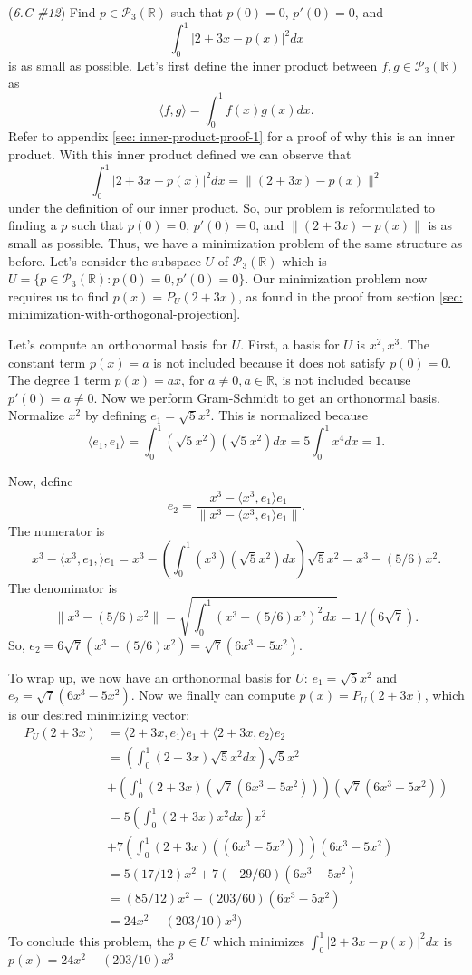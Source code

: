 \documentclass{article}
\newcommand{\R}{\mathbb{R}}
\newcommand{\la}{\langle}
\newcommand{\ra}{\rangle}
\theoremstyle{definition}
\begin{document}
\begin{problem}{(\textit{6.C \#12}) Find $p \in \mathcal{P}_3(\R)$ such that $p(0) = 0$, $p'(0) = 0$, and $$\int_0^1 |2 + 3x - p(x)|^2dx$$ is as small as possible.}
    Let's first define the inner product between $f, g \in \mathcal{P}_3(\R)$ as $$\la f, g \ra = \int_0^1 f(x)g(x) dx.$$ Refer to appendix \ref{sec: inner-product-proof-1} for a proof of why this is an inner product. With this inner product defined we can observe that $$\int_0^1 |2 + 3x - p(x)|^2dx = \|(2 + 3x) - p(x)\|^2$$ under the definition of our inner product. So, our problem is reformulated to finding a $p$ such that $p(0) = 0$, $p'(0) = 0$, and $\|(2 + 3x) - p(x)\|$ is as small as possible. Thus, we have a minimization problem of the same structure as before. Let's consider the subspace $U$ of $\mathcal{P}_3(\R)$ which is $U = \{p \in \mathcal{P}_3(\R) : p(0) = 0, p'(0) = 0\}$. Our minimization problem now requires us to find $p(x) = P_U(2 + 3x)$, as found in the proof from section \ref{sec: minimization-with-orthogonal-projection}.

    Let's compute an orthonormal basis for $U$. First, a basis for $U$ is $x^2, x^3$. The constant term $p(x) = a$ is not included because it does not satisfy $p(0) = 0$. The degree 1 term $p(x) = ax$, for $a \neq 0, a \in \R$, is not included because $p'(0) = a \neq 0$. Now we perform Gram-Schmidt to get an orthonormal basis. Normalize $x^2$ by defining $e_1 = \sqrt{5}x^2$. This is normalized because $$\la e_1, e_1 \ra = \int_0^1(\sqrt{5}x^2)(\sqrt{5}x^2)dx = 5\int_0^1x^4dx = 1.$$

    Now, define $$e_2 = \frac{x^3 - \la x^3, e_1 \ra e_1}{\|x^3 - \la x^3, e_1 \ra e_1\|}.$$ The numerator is $$x^3 - \la x^3, e_1, \ra e_1 = x^3 - \left(\int_0^1 (x^3)(\sqrt{5}x^2)dx\right) \sqrt{5}x^2 = x^3 - (5/6)x^2.$$ The denominator is $$\|x^3 - (5/6)x^2\| = \sqrt{\int_0^1 (x^3 - (5/6)x^2)^2dx} = 1/(6\sqrt{7}).$$ So, $e_2 = 6\sqrt{7}(x^3 - (5/6)x^2) = \sqrt{7}(6x^3 - 5x^2)$.

    To wrap up, we now have an orthonormal basis for $U$: $e_1 = \sqrt{5}x^2$ and $e_2 = \sqrt{7}(6x^3-5x^2)$. Now we finally can compute $p(x) = P_U(2 + 3x)$, which is our desired minimizing vector:
    \begin{align*}
        P_U(2 + 3x) &= \la 2 + 3x, e_1 \ra e_1 + \la 2 + 3x, e_2 \ra e_2 \\
        &= \left(\int_0^1(2 + 3x)\sqrt{5}x^2dx\right) \sqrt{5}x^2 \\&+\left(\int_0^1(2 + 3x)(\sqrt{7}(6x^3 - 5x^2))\right)(\sqrt{7}(6x^3 - 5x^2)) \\
        &= 5\left(\int_0^1(2 + 3x)x^2dx\right) x^2 \\&+ 7\left(\int_0^1(2 + 3x)((6x^3 - 5x^2))\right) (6x^3 - 5x^2)\\
        &= 5(17/12)x^2 + 7(-29/60)(6x^3 - 5x^2) \\
        &= (85/12)x^2 - (203/60)(6x^3 - 5x^2) \\
        &= 24 x^2 - (203/10)x^3)
    \end{align*}
    To conclude this problem, the $p \in U$ which minimizes $\int_0^1 |2 + 3x - p(x)|^2dx$ is $p(x) = 24x^2 - (203/10)x^3$
\end{problem}
\end{document}
